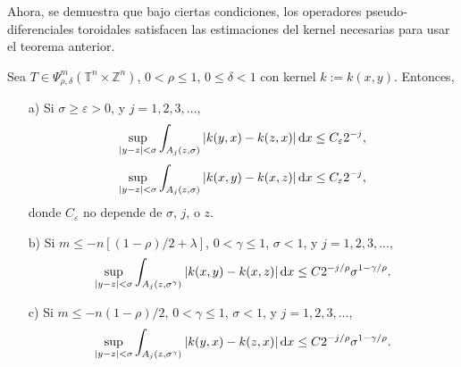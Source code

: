 Ahora, se demuestra que bajo ciertas condiciones, los operadores pseudo-diferenciales toroidales satisfacen las estimaciones del kernel necesarias para usar el teorema anterior. 
\begin{theorem}
	Sea $T\in \Psi^m_{\rho,\delta}(\mathbb{T}^n\times\mathbb{Z}^n)$, $0<\rho\leq1$, $0\leq\delta<1$ con kernel $k:=k(x, y)$. Entonces, 
	\begin{itemize}
		\item[a)] Si $\sigma \geq \varepsilon>0$, y $j=1,2,3,...$,
		\begin{equation}
			\sup_{|y-z|<\sigma}\int_{A_j(z, \sigma)} |k(y, x) - k(z, x)|\mathop{}\!\mathrm{d} x \leq C_\varepsilon2^{-j},
		\end{equation}
		\begin{equation}
			\sup_{|y-z|<\sigma}\int_{A_j(z, \sigma)} |k(x, y) - k(x, z)|\mathop{}\!\mathrm{d} x \leq C_\varepsilon2^{-j},
		\end{equation}
		donde $C_\varepsilon$ no depende de $\sigma$, $j$, o $z$.
		\item[b)] Si $m\leq -n[(1-\rho)/2 +\lambda]$, $0<\gamma\leq1$, $\sigma<1$, y $j=1,2,3,...$, 
		\begin{equation}
			\sup_{|y-z|<\sigma}\int_{A_j(z, \sigma^\gamma)} |k(x, y) - k(x, z)|\mathop{}\!\mathrm{d} x \leq C2^{-j/\rho}\sigma^{1-\gamma/\rho}.
		\end{equation}
		
		\item[c)] Si $m\leq -n(1-\rho)/2 $, $0<\gamma\leq1$, $\sigma<1$, y $j=1,2,3,...$, 
		\begin{equation}
			\sup_{|y-z|<\sigma}\int_{A_j(z, \sigma^\gamma)} |k(y, x) - k(z, x)|\mathop{}\!\mathrm{d} x \leq C2^{-j/\rho}\sigma^{1-\gamma/\rho}.
			\label{eq:kernel-estimate-c}
		\end{equation}
		
	\end{itemize}
	\label{theo:pdo-kernel}
\end{theorem}
